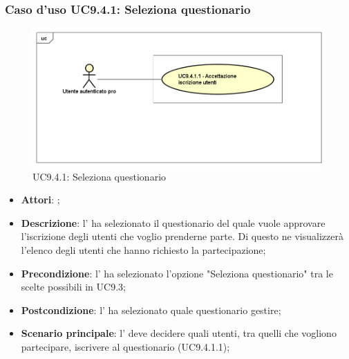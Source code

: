 		 \subsubsection{Caso d'uso UC9.4.1: Seleziona questionario}
		 \label{UC9.4.1}
		 \begin{figure}[h]
		 	\centering
		 	\includegraphics[scale=0.5,keepaspectratio]{UML/UC9_4_1.png}
		 	\caption{UC9.4.1: Seleziona questionario}
		 \end{figure}
		 \FloatBarrier
		 \begin{itemize}
		 	\item \textbf{Attori}: \uaupro{};
		 	\item \textbf{Descrizione}: l'\uaupro{} ha selezionato il questionario del quale vuole approvare l'iscrizione degli utenti che voglio prenderne parte. Di questo ne visualizzerà l'elenco degli utenti che hanno richiesto la partecipazione; 
		 	\item \textbf{Precondizione}: l'\uaupro{} ha selezionato l'opzione "Seleziona questionario" tra le scelte possibili in UC9.3;
		 	\item \textbf{Postcondizione}: l'\uaupro{} ha selezionato quale questionario gestire;
		 	\item \textbf{Scenario principale}: l'\uaupro{} deve decidere quali utenti, tra quelli che vogliono partecipare, iscrivere al questionario (UC9.4.1.1);
		 \end{itemize}
		 

